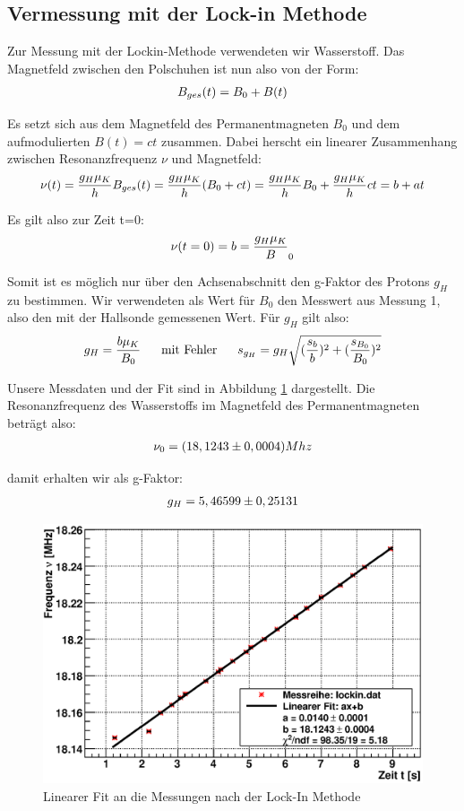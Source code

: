 \documentclass[12pt]{article}
\begin{document}
\subsection{Vermessung mit der Lock-in Methode}
Zur Messung mit der Lockin-Methode verwendeten wir Wasserstoff. Das Magnetfeld zwischen den Polschuhen ist nun also von der Form:
\begin{align}
 \notag B_{ges}(t)=B_0+B(t)
\end{align}

Es setzt sich aus dem Magnetfeld des Permanentmagneten $B_0$ und dem aufmodulierten $B(t)=c t$ zusammen. Dabei herscht ein linearer Zusammenhang zwischen Resonanzfrequenz $\nu$ und Magnetfeld:
\begin{align}
 \notag \nu(t)=\frac{g_H\mu_K}{h}B_{ges}(t)=\frac{g_H\mu_K}{h}(B_0+c t)=\frac{g_H\mu_K}{h}B_0 + \frac{g_H\mu_K}{h}c t= b+at
\end{align}

Es gilt also zur Zeit t=0:
\begin{align}
 \notag \nu(t=0) = b = \frac{g_H\mu_K} B_0
\end{align}

Somit ist es möglich nur über den Achsenabschnitt den g-Faktor des Protons $g_H$ zu bestimmen. Wir verwendeten als Wert für $B_0$ den Messwert aus Messung 1, also den mit der Hallsonde gemessenen Wert. Für $g_H$ gilt also:
\begin{align}
 \notag g_H=\frac{b \mu_K}{B_0}~~~~~\textnormal{mit Fehler}~~~~~s_{g_H}=g_H\sqrt{(\frac{s_b}{b})^2+(\frac{s_{B_0}}{B_0})^2}
\end{align}

Unsere Messdaten und der Fit sind in Abbildung \ref{lockin} dargestellt. Die Resonanzfrequenz des Wasserstoffs im Magnetfeld des Permanentmagneten beträgt also:
\begin{align}
 \notag \nu_0= (18,1243\pm0,0004)Mhz
\end{align}

damit erhalten wir als g-Faktor:
\begin{align}
  \notag g_H= 5,46599 \pm 0,25131
\end{align}


\begin{figure}[H]
\centering
\includegraphics[width=0.9\linewidth]{pictures/lockin.eps}
\caption{Linearer Fit an die Messungen nach der Lock-In Methode}
\label{lockin}
\end{figure}
\end{document}
